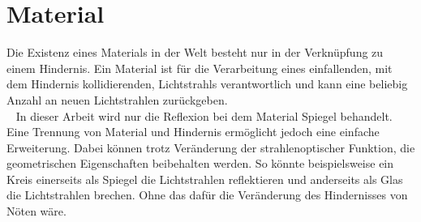 \section{Material}
\label{material}
Die Existenz eines Materials  in der Welt besteht nur in der Verknüpfung zu einem Hindernis. 
Ein Material ist für die Verarbeitung eines einfallenden, mit dem Hindernis kollidierenden, Lichtstrahls verantwortlich 
und kann eine beliebig Anzahl an neuen Lichtstrahlen zurückgeben. \\ 
In dieser Arbeit wird nur die Reflexion bei dem Material Spiegel  behandelt. 
Eine Trennung von Material und Hindernis ermöglicht jedoch eine einfache Erweiterung.
Dabei können trotz Veränderung der strahlenoptischer Funktion, die geometrischen Eigenschaften beibehalten werden.
So könnte beispielsweise ein Kreis einerseits als Spiegel die Lichtstrahlen reflektieren 
und anderseits als Glas die Lichtstrahlen brechen. Ohne das dafür die Veränderung des Hindernisses von Nöten wäre.

